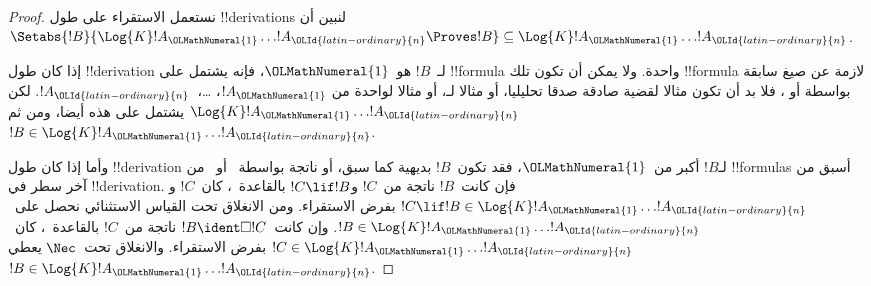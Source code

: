 \documentclass[../../../include/open-logic-section]{subfiles}
\begin{document}
\begin{proof}
  نستعمل الاستقراء على طول !!{derivation}s لنبين أن
  $\Setabs{!B}{\Log{K} !A_\OLMathNumeral{1} \dots !A_\OLId{latin-ordinary}{n} \Proves !B} \subseteq
  \Log{K} !A_\OLMathNumeral{1} \dots !A_\OLId{latin-ordinary}{n}$.

  إذا كان طول !!{derivation} لـ~$!B$ هو~$\OLMathNumeral{1}$، فإنه يشتمل على
  !!{formula} واحدة. ولا يمكن أن تكون تلك !!{formula} لازمة عن صيغ
  سابقة بواسطة \MP{} أو \Nec، فلا بد أن تكون مثالا لقضية صادقة صدقا
  تحليليا، أو مثالا لـ، أو مثالا
  لواحدة من $!A_\OLMathNumeral{1}$، \dots،~$!A_\OLId{latin-ordinary}{n}$. لكن $\Log{K}!A_\OLMathNumeral{1}\dots!A_\OLId{latin-ordinary}{n}$ يشتمل
  على هذه أيضا، ومن ثم $!B \in \Log{K}!A_\OLMathNumeral{1} \dots !A_\OLId{latin-ordinary}{n}$.

  وأما إذا كان طول !!{derivation} لـ$!B$ أكبر من~$\OLMathNumeral{1}$،
  فقد تكون~$!B$ بديهية كما سبق، أو ناتجة بواسطة~\MP{} أو~\Nec{}
  من !!{formula}s أسبق من آخر سطر في !!{derivation}.
  فإن كانت~$!B$ ناتجة من~$!C$ و$!C \lif !B$ بالقاعدة~\MP،
  كان~$!C$ و$!C \lif !B \in
  \Log{K}!A_\OLMathNumeral{1} \dots !A_\OLId{latin-ordinary}{n}$ بفرض الاستقراء. ومن الانغلاق تحت
  القياس الاستثنائي نحصل على~$!B \in \Log{K}!A_\OLMathNumeral{1} \dots !A_\OLId{latin-ordinary}{n}$.
  وإن كانت~$!B \ident \Box !C$ ناتجة من~$!C$ بالقاعدة~\Nec،
  كان~$!C
  \in \Log{K}!A_\OLMathNumeral{1} \dots !A_\OLId{latin-ordinary}{n}$ بفرض الاستقراء. والانغلاق
  تحت~$\Nec$ يعطي~$!B \in
  \Log{K}!A_\OLMathNumeral{1}\dots!A_\OLId{latin-ordinary}{n}$.


\end{proof}
\end{document}
